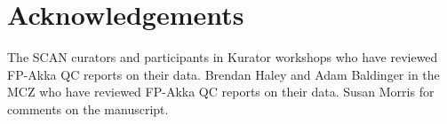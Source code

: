 \documentclass{article}
\begin{document}
\section{Acknowledgements}
The SCAN curators and participants in Kurator workshops who have reviewed FP-Akka QC reports on their data.  
Brendan Haley and Adam Baldinger in the MCZ who have reviewed FP-Akka QC reports on their data.
Susan Morris for comments on the manuscript.



\newpage
{}
\end{document}
